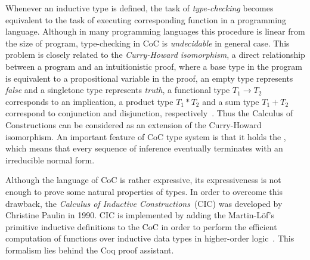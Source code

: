 \documentclass[article]{aaltoseries}
\begin{document}
Whenever an inductive type is defined, the task of \textit{type-checking} becomes equivalent to the task of executing corresponding function in a programming language. Although in many programming languages this procedure is linear from the size of program, type-checking in CoC is \textit{undecidable} in general case. This problem is closely related to the \textit{Curry-Howard isomorphism}, a direct relationship between a program and an intuitionistic proof, where a base type in the program is equivalent to a propositional variable in the proof, an empty type represents \textit{false} and a singletone type represents \textit{truth}, a functional type $T_{1} \rightarrow T_{2}$ corresponds to an implication, a product type $T_{1} * T_{2}$ and a sum type $T_{1} + T_{2}$ correspond to conjunction and disjunction, respectively~\cite{Pierce2002}. Thus the Calculus of Constructions can be considered as an extension of the Curry-Howard isomorphism.
An important feature of CoC type system is that it holds the , which means that every sequence of inference eventually terminates with an irreducible normal form.

%

Although the language of CoC is rather expressive, its expressiveness is not enough to prove some natural properties of types. In order to overcome this drawback, the \textit{Calculus of Inductive Constructions}~(CIC) was developed by Christine Paulin in 1990. CIC is implemented by adding the Martin-Löf's primitive inductive definitions to the CoC in order to perform the efficient computation of functions over inductive data types in higher-order logic~\cite{Paulin15}. This formalism lies behind the Coq proof assistant.
\end{document}
